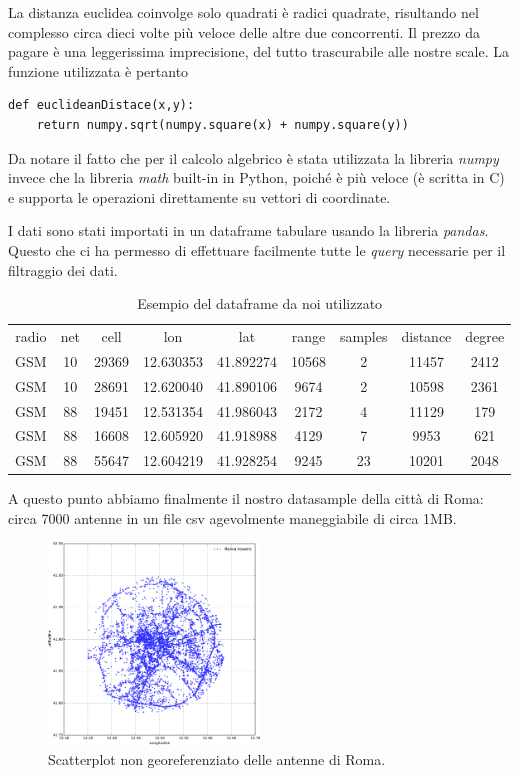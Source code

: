 La distanza euclidea coinvolge solo quadrati è radici quadrate, risultando nel complesso circa dieci volte più veloce delle altre due concorrenti. Il prezzo da pagare è una leggerissima imprecisione, del tutto trascurabile alle nostre scale. La funzione utilizzata è pertanto
\begin{lstlisting}
def euclideanDistace(x,y):
    return numpy.sqrt(numpy.square(x) + numpy.square(y))
\end{lstlisting}
Da notare il fatto che per il calcolo algebrico è stata utilizzata la libreria \emph{numpy} invece che la libreria \emph{math} built-in in Python, poiché è più veloce (è scritta in C) e supporta le operazioni direttamente su vettori di coordinate.

I dati sono stati importati in un dataframe tabulare usando la libreria \emph{pandas}. Questo che ci ha permesso di effettuare facilmente tutte le \emph{query} necessarie per il filtraggio dei dati.
\clearpage
\begin{table}[t]
\caption{Esempio del dataframe da noi utilizzato}
	\begin{tabular}{ccccccccc}
	\toprule
radio	&net &cell 	&lon 	 &lat 		&range 	&samples 	&distance &degree\\
GSM		&10 	&29369 	&12.630353 &41.892274 	&10568 	&2 		&11457 	&2412\\
GSM 		&10 	&28691 	&12.620040 &41.890106 	&9674 	&2 		&10598 	&2361\\
GSM 		&88 	&19451 	&12.531354 &41.986043 	&2172 	&4 		&11129 	&179\\
GSM 		&88 	&16608 	&12.605920 &41.918988 	&4129 	&7 		&9953 	&621\\
GSM 		&88 	&55647 	&12.604219 &41.928254 	&9245 	&23 		&10201 	&2048\\
\bottomrule
	\end{tabular}
\label{tab:datinostri}
\end{table}

A questo punto abbiamo finalmente il nostro datasample della città di Roma: circa 7000 antenne in un file csv agevolmente maneggiabile di circa 1MB.

\begin{figure}[b!]
	\centering
	\includegraphics[width=0.5\textwidth]{./Immagini/Dati/roma}
	\caption{Scatterplot non georeferenziato delle antenne di Roma.}
	\label{fig:napp}
\end{figure}

